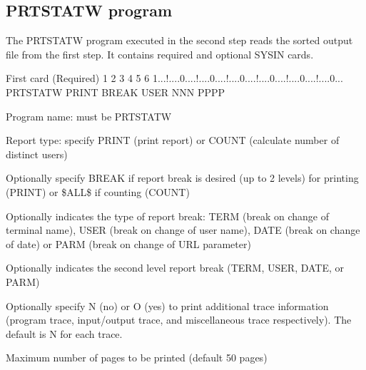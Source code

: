 \documentclass[letterpaper,10pt,english]{sphinxmanual}
\begin{document}
\ignorespaces 

\subsection{PRTSTATW program}
\label{\detokenize{audit_operations_ and_performance:prtstatw-program}}\label{\detokenize{audit_operations_ and_performance:index-90}}
\sphinxAtStartPar
The PRTSTATW program executed in the second step reads the sorted output file from the first step. It contains required and optional SYSIN cards.

\begin{sphinxVerbatim}[commandchars=\\\{\}]
First card (Required)
         1         2         3         4         5         6
1...!....0....!....0....!....0....!....0....!....0....!....0...
PRTSTATW PRINT                BREAK USER          NNN  PPPP
\end{sphinxVerbatim}

\sphinxAtStartPar
{}
\begin{description}
\sphinxAtStartPar
Program name: must be PRTSTATW

\sphinxAtStartPar
Report type: specify PRINT (print report) or COUNT (calculate number of distinct users)

\sphinxAtStartPar
Optionally specify BREAK if report break is desired (up to 2 levels) for printing (PRINT) or \$ALL\$ if counting (COUNT)

\sphinxAtStartPar
Optionally indicates the type of report break: TERM (break on change of terminal name), USER (break on change of user name), DATE (break on change of date) or PARM (break on change of URL parameter)

\sphinxAtStartPar
Optionally indicates the second level report break (TERM, USER, DATE, or PARM)

\sphinxAtStartPar
Optionally specify N (no) or O (yes) to print additional trace information (program trace, input/output trace, and miscellaneous trace respectively). The default is N for each trace.

\sphinxAtStartPar
Maximum number of pages to be printed (default 50 pages)

\end{description}
\end{document}
